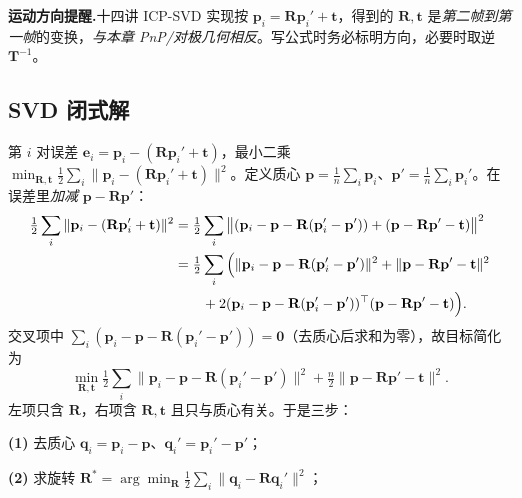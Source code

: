 \begin{note}
\textbf{运动方向提醒.}\;十四讲 ICP-SVD 实现按 $\mathbf{p}_i=\mathbf{R}\mathbf{p}_i'+\mathbf{t}$，得到的 $\mathbf{R},\mathbf{t}$ 是\emph{第二帧到第一帧}的变换，\emph{与本章 PnP/对极几何相反}\cite{gaoxiang2019slam14}。写公式时务必标明方向，必要时取逆 $\mathbf{T}^{-1}$。
\end{note}

\subsection{SVD 闭式解}
\label{sec:vo-icp-svd}

\begin{derivation}
\label{thm:vo-icp-svd}
第 $i$ 对误差 $\mathbf{e}_i=\mathbf{p}_i-(\mathbf{R}\mathbf{p}_i'+\mathbf{t})$，最小二乘 $\min_{\mathbf{R},\mathbf{t}}\tfrac12\sum_i\|\mathbf{p}_i-(\mathbf{R}\mathbf{p}_i'+\mathbf{t})\|^2$\cite{gaoxiang2019slam14}。定义质心 $\mathbf{p}=\tfrac1n\sum_i\mathbf{p}_i$、$\mathbf{p}'=\tfrac1n\sum_i\mathbf{p}_i'$。在误差里\emph{加减} $\mathbf{p}-\mathbf{R}\mathbf{p}'$：
\begin{align}
  \tfrac12\sum_i\|\mathbf{p}_i-(\mathbf{R}\mathbf{p}_i'+\mathbf{t})\|^2
  &=\tfrac12\sum_i\big\|(\mathbf{p}_i-\mathbf{p}-\mathbf{R}(\mathbf{p}_i'-\mathbf{p}'))+(\mathbf{p}-\mathbf{R}\mathbf{p}'-\mathbf{t})\big\|^2\notag\\
  &=\tfrac12\sum_i\Big(\|\mathbf{p}_i-\mathbf{p}-\mathbf{R}(\mathbf{p}_i'-\mathbf{p}')\|^2+\|\mathbf{p}-\mathbf{R}\mathbf{p}'-\mathbf{t}\|^2\notag\\
  &\qquad+2(\mathbf{p}_i-\mathbf{p}-\mathbf{R}(\mathbf{p}_i'-\mathbf{p}'))^\top(\mathbf{p}-\mathbf{R}\mathbf{p}'-\mathbf{t})\Big).
  \label{eq:vo-icp-expand}
\end{align}
交叉项中 $\sum_i(\mathbf{p}_i-\mathbf{p}-\mathbf{R}(\mathbf{p}_i'-\mathbf{p}'))=\mathbf{0}$（去质心后求和为零），故目标简化为
\begin{equation}
  \min_{\mathbf{R},\mathbf{t}}\tfrac12\sum_i\|\mathbf{p}_i-\mathbf{p}-\mathbf{R}(\mathbf{p}_i'-\mathbf{p}')\|^2+\tfrac{n}{2}\|\mathbf{p}-\mathbf{R}\mathbf{p}'-\mathbf{t}\|^2.
  \label{eq:vo-icp-split}
\end{equation}
左项只含 $\mathbf{R}$，右项含 $\mathbf{R},\mathbf{t}$ 且只与质心有关。于是三步：

\textbf{(1)} 去质心 $\mathbf{q}_i=\mathbf{p}_i-\mathbf{p}$、$\mathbf{q}_i'=\mathbf{p}_i'-\mathbf{p}'$；

\textbf{(2)} 求旋转 $\mathbf{R}^*=\arg\min_{\mathbf{R}}\tfrac12\sum_i\|\mathbf{q}_i-\mathbf{R}\mathbf{q}_i'\|^2$；


\end{derivation}
